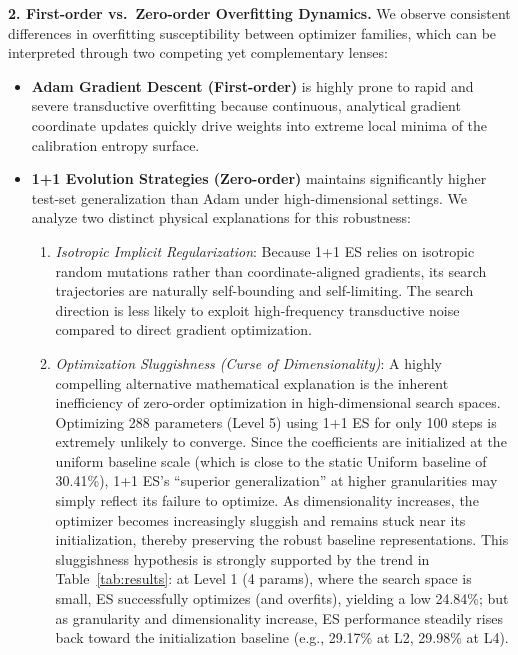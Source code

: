 \textbf{2. First-order vs.\ Zero-order Overfitting Dynamics.} 
We observe consistent differences in overfitting susceptibility between optimizer families, which can be interpreted through two competing yet complementary lenses:
\begin{itemize}
    \item \textbf{Adam Gradient Descent (First-order)} is highly prone to rapid and severe transductive overfitting because continuous, analytical gradient coordinate updates quickly drive weights into extreme local minima of the calibration entropy surface.
    \item \textbf{1+1 Evolution Strategies (Zero-order)} maintains significantly higher test-set generalization than Adam under high-dimensional settings. We analyze two distinct physical explanations for this robustness:
    \begin{enumerate}
        \item \emph{Isotropic Implicit Regularization}: Because 1+1 ES relies on isotropic random mutations rather than coordinate-aligned gradients, its search trajectories are naturally self-bounding and self-limiting. The search direction is less likely to exploit high-frequency transductive noise compared to direct gradient optimization.
        \item \emph{Optimization Sluggishness (Curse of Dimensionality)}: A highly compelling alternative mathematical explanation is the inherent inefficiency of zero-order optimization in high-dimensional search spaces. Optimizing 288 parameters (Level 5) using 1+1 ES for only 100 steps is extremely unlikely to converge. Since the coefficients are initialized at the uniform baseline scale (which is close to the static Uniform baseline of 30.41\%), 1+1 ES's ``superior generalization'' at higher granularities may simply reflect its failure to optimize. As dimensionality increases, the optimizer becomes increasingly sluggish and remains stuck near its initialization, thereby preserving the robust baseline representations. This sluggishness hypothesis is strongly supported by the trend in Table~\ref{tab:results}: at Level 1 (4 params), where the search space is small, ES successfully optimizes (and overfits), yielding a low 24.84\%; but as granularity and dimensionality increase, ES performance steadily rises back toward the initialization baseline (e.g., 29.17\% at L2, 29.98\% at L4).
    \end{enumerate}
\end{itemize}

